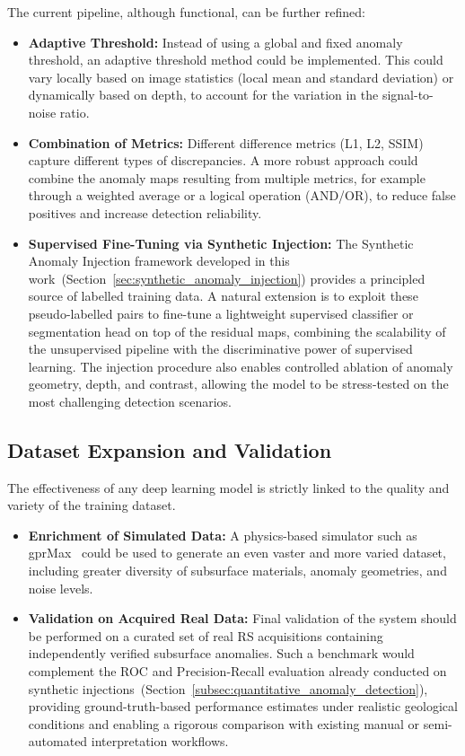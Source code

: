 The current pipeline, although functional, can be further refined:
\begin{itemize}
    \item \textbf{Adaptive Threshold:} Instead of using a global and fixed anomaly threshold, an adaptive threshold method could be implemented. This could vary locally based on image statistics (local mean and standard deviation) or dynamically based on depth, to account for the variation in the signal-to-noise ratio.
    \item \textbf{Combination of Metrics:} Different difference metrics (L1, L2, SSIM) capture different types of discrepancies. A more robust approach could combine the anomaly maps resulting from multiple metrics, for example through a weighted average or a logical operation (AND/OR), to reduce false positives and increase detection reliability.
    \item \textbf{Supervised Fine-Tuning via Synthetic Injection:} The Synthetic Anomaly Injection framework developed in this work~(Section~\ref{sec:synthetic_anomaly_injection}) provides a principled source of labelled training data. A natural extension is to exploit these pseudo-labelled pairs to fine-tune a lightweight supervised classifier or segmentation head on top of the residual maps, combining the scalability of the unsupervised pipeline with the discriminative power of supervised learning. The injection procedure also enables controlled ablation of anomaly geometry, depth, and contrast, allowing the model to be stress-tested on the most challenging detection scenarios.
\end{itemize}

\subsection{Dataset Expansion and Validation}
The effectiveness of any deep learning model is strictly linked to the quality and variety of the training dataset.
\begin{itemize}
    \item \textbf{Enrichment of Simulated Data:} A physics-based simulator such as gprMax~\cite{Warren_2016} could be used to generate an even vaster and more varied dataset, including greater diversity of subsurface materials, anomaly geometries, and noise levels.
    \item \textbf{Validation on Acquired Real Data:} Final validation of the system should be performed on a curated set of real RS acquisitions containing independently verified subsurface anomalies. Such a benchmark would complement the ROC and Precision-Recall evaluation already conducted on synthetic injections~(Section~\ref{subsec:quantitative_anomaly_detection}), providing ground-truth-based performance estimates under realistic geological conditions and enabling a rigorous comparison with existing manual or semi-automated interpretation workflows.
\end{itemize}

